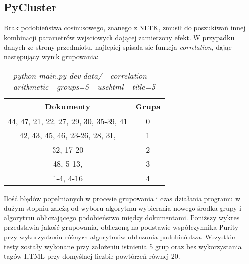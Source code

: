 \documentclass{article}
\begin{document}
\subsection{PyCluster}
Brak podobieństwa cosinusowego, znanego z NLTK, zmusił do poszukiwań innej kombinacji parametrów wejsciowych dającej zamierzony efekt. W przypadku danych ze strony przedmiotu, najlepiej spisała sie funkcja \emph{correlation}, dając następujący wynik grupowania:

\begin{table}[H]
\begin{center}
\begin{tabular}{ | c | c | }
\hline
Dokumenty & Grupa \\ \hline
44, 47, 21, 22, 27, 29, 30, 35-39, 41 & 0 \\ \hline
42, 43, 45, 46, 23-26, 28, 31,  & 1 \\ \hline
32, 17-20 & 2 \\ \hline
48, 5-13,  & 3 \\ \hline
1-4, 4-16 & 4 \\ \hline
\end{tabular}
\caption{\emph{python main.py dev-data/ -{}-correlation -{}-arithmetic -{}-groups=5 -{}-usehtml -{}-title=5}}
\end{center}
\end{table}

Ilość błędów popełnianych w procesie grupowania i czas działania programu w dużym stopniu zależą od wyboru algorytmu wybierania nowego środka grupy i algorytmu obliczającego podobieństwo między dokumentami. Poniższy wykres przedstawia jakość grupowania, obliczoną na podstawie współczynnika Purity przy wykorzystaniu różnych algorytmów obliczania podobieństwa. Wszystkie testy zostały wykonane przy założeniu istnienia 5 grup oraz bez wykorzystania tagów HTML przy domyślnej liczbie powtórzeń równej 20.

\begin{center}
\end{center}
\end{document}
